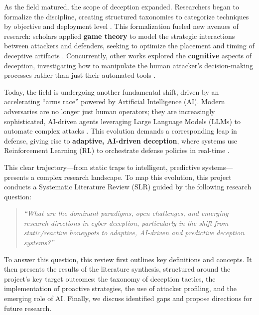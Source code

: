 As the field matured, the scope of deception expanded. Researchers began to formalize
the discipline, creating structured taxonomies to categorize techniques by objective
and deployment level \cite{han2018deception}. This formalization fueled new avenues
of research: scholars applied \textbf{game theory} to model the strategic interactions
between attackers and defenders, seeking to optimize the placement and timing of
deceptive artifacts \cite{carroll2011game,schlenker2018deceiving}. Concurrently,
other works explored the \textbf{cognitive} aspects of deception, investigating how
to manipulate the human attacker's decision-making processes rather than just their
automated tools \cite{ferguson2021examining}.

Today, the field is undergoing another fundamental shift, driven by an accelerating
``arms race'' powered by Artificial Intelligence (AI). Modern adversaries are no
longer just human operators; they are increasingly sophisticated, AI-driven agents
leveraging Large Language Models (LLMs) to automate complex attacks
\cite{deng2023pentestgpt,fang2024llm}. This evolution demands a corresponding leap
in defense, giving rise to \textbf{adaptive, AI-driven deception}, where systems
use Reinforcement Learning (RL) to orchestrate defense policies in real-time
\cite{hammad2024deep}.

This clear trajectory---from static traps to intelligent, predictive systems---presents
a complex research landscape. To map this evolution, this project conducts a Systematic
Literature Review (SLR) guided by the following research question:

\begin{quote}
    \textit{``What are the dominant paradigms, open challenges, and emerging research
        directions in cyber deception, particularly in the shift from static/reactive
        honeypots to adaptive, AI-driven and predictive deception systems?''}
\end{quote}

To answer this question, this review first outlines key definitions and concepts.
It then presents the results of the literature synthesis, structured around the
project's key target outcomes: the taxonomy of deception tactics, the implementation
of proactive strategies, the use of attacker profiling, and the emerging role of AI.
Finally, we discuss identified gaps and propose directions for future research.
